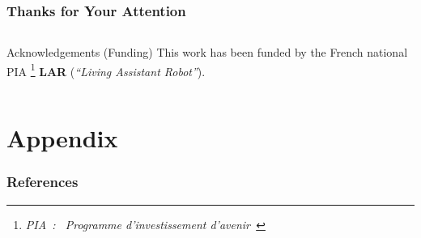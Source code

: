 \documentclass[10pt,c]{beamer}
\begin{document}

\appendix


\begin{frame}[b]
\frametitle{Thanks for Your Attention}
\begin{block}{}
\end{block}
\vspace{1.25cm}
\begin{columns}[c]
\begin{column}{8cm}
\begin{block}{\small Acknowledgements (Funding)}
\small
This work has been funded by the French national PIA
\footnote{\scriptsize\textsl{PIA~: \guillemotleft~Programme
d'investissement d'avenir~\guillemotright}}
\textbf{LAR} (\textit{``Living Assistant Robot''}).
\end{block}
\end{column}
\end{columns}
\vspace{0.3cm}
\end{frame}


\section{Appendix}

\begin{frame}[t]
\frametitle{References}
\tiny


\end{frame}



\end{document}
